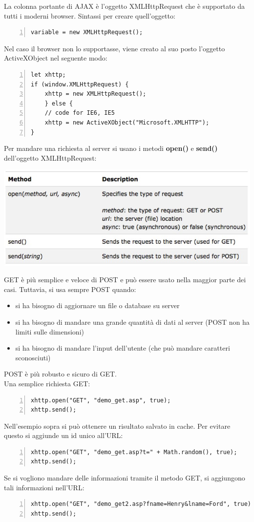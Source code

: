 La colonna portante di AJAX è l'oggetto XMLHttpRequest che è supportato da tutti i moderni browser. Sintassi per creare quell'oggetto:
\begin{Verbatim}[numbers = left, frame = single]
variable = new XMLHttpRequest();
\end{Verbatim}
Nel caso il browser non lo supportasse, viene creato al suo posto l'oggetto ActiveXObject nel seguente modo:
\begin{Verbatim}[numbers = left, frame = single]
let xhttp;
if (window.XMLHttpRequest) {
    xhttp = new XMLHttpRequest();
    } else {
    // code for IE6, IE5
    xhttp = new ActiveXObject("Microsoft.XMLHTTP");
}
\end{Verbatim}
Per mandare una richiesta al server si usano i metodi \textbf{open()} e \textbf{send()} dell'oggetto XMLHttpRequest:
\begin{center}
    \includegraphics[scale=0.5]{Images/TecnologieWeb/8/MetodiAJAX.jpg}
\end{center}
GET è più semplice e veloce di POST e può essere usato nella maggior parte dei casi. Tuttavia, si usa sempre POST quando:
\begin{itemize}
    \item si ha bisogno di aggiornare un file o database su server
    \item si ha bisogno di mandare una grande quantità di dati al server (POST non ha limiti sulle dimensioni)
    \item si ha bisogno di mandare l'input dell'utente (che può mandare caratteri sconosciuti)
\end{itemize}
POST è più robusto e sicuro di GET.\\

Una semplice richiesta GET:
\begin{Verbatim}[numbers = left, frame = single]
xhttp.open("GET", "demo_get.asp", true);
xhttp.send();
\end{Verbatim}
Nell'esempio sopra si può ottenere un risultato salvato in cache. Per evitare questo si aggiunde un id unico all'URL:
\begin{Verbatim}[numbers = left, frame = single]
xhttp.open("GET", "demo_get.asp?t=" + Math.random(), true);
xhttp.send();
\end{Verbatim}
Se si vogliono mandare delle informazioni tramite il metodo GET, si aggiungono tali informazioni nell'URL:
\begin{Verbatim}[numbers = left, frame = single]
xhttp.open("GET", "demo_get2.asp?fname=Henry&lname=Ford", true);
xhttp.send();
\end{Verbatim}

